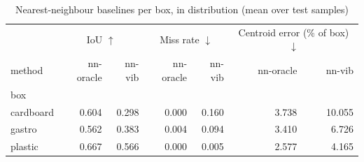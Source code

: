 \begin{table}
\caption{Nearest-neighbour baselines per box, in distribution (mean over test samples)}
\label{tab:baselines_per_box}
\begin{tabular}{lrrrrrr}
\toprule
 & \multicolumn{2}{c}{IoU $\uparrow$} & \multicolumn{2}{c}{Miss rate $\downarrow$} & \multicolumn{2}{c}{Centroid error (\% of box) $\downarrow$} \\
method & nn-oracle & nn-vib & nn-oracle & nn-vib & nn-oracle & nn-vib \\
box &  &  &  &  &  &  \\
\midrule
cardboard & 0.604 & 0.298 & 0.000 & 0.160 & 3.738 & 10.055 \\
gastro & 0.562 & 0.383 & 0.004 & 0.094 & 3.410 & 6.726 \\
plastic & 0.667 & 0.566 & 0.000 & 0.005 & 2.577 & 4.165 \\
\bottomrule
\end{tabular}
\end{table}

